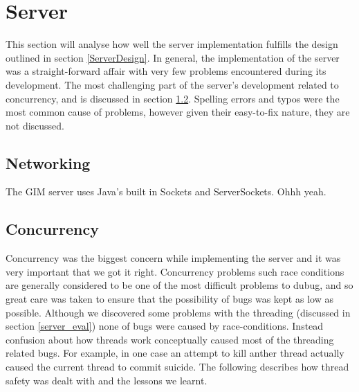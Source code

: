 \section{Server}

This section will analyse how well the server implementation fulfills the design outlined in section \ref{ServerDesign}. In general, the implementation of the server was a straight-forward affair with very few problems encountered during its development. The most challenging part of the server's development related to concurrency, and is discussed in section \ref{concur}. Spelling errors and typos were the most common cause of problems, however given their easy-to-fix nature, they are not discussed.

\subsection{Networking}
The GIM server uses Java's built in Sockets and ServerSockets.  Ohhh yeah.

\subsection{Concurrency}
\label{concur}
Concurrency was the biggest concern while implementing the server and it was very important that we got it right. Concurrency problems such race conditions are generally considered to be one of the most difficult problems to dubug, and so great care was taken to ensure that the possibility of bugs was kept as low as possible. Although we discovered some problems with the threading (discussed in section \ref{server_eval}) none of bugs were caused by race-conditions. Instead confusion about how threads work conceptually caused most of the threading related bugs. For example, in one case an attempt to kill anther thread actually caused the current thread to commit suicide. The following describes how thread safety was dealt with and the lessons we learnt.

